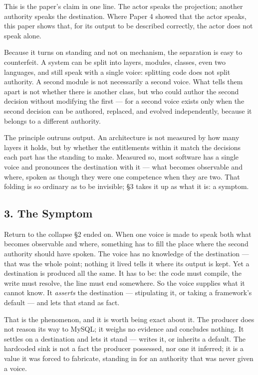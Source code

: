 \documentclass[
]{article}
\begin{document}
This is the paper's claim in one line. The actor speaks the projection;
another authority speaks the destination. Where Paper 4 showed that the
actor speaks, this paper shows that, for its output to be described
correctly, the actor does not speak alone.

Because it turns on standing and not on mechanism, the separation is
easy to counterfeit. A system can be split into layers, modules,
classes, even two languages, and still speak with a single voice:
splitting code does not split authority. A second module is not
necessarily a second voice. What tells them apart is not whether there
is another class, but who could author the second decision without
modifying the first --- for a second voice exists only when the second
decision can be authored, replaced, and evolved independently, because
it belongs to a different authority.

The principle outruns output. An architecture is not measured by how
many layers it holds, but by whether the entitlements within it match
the decisions each part has the standing to make. Measured so, most
software has a single voice and pronounces the destination with it ---
what becomes observable and where, spoken as though they were one
competence when they are two. That folding is so ordinary as to be
invisible; §3 takes it up as what it is: a symptom.

\subsection{3. The Symptom}\label{the-symptom}

Return to the collapse §2 ended on. When one voice is made to speak both
what becomes observable and where, something has to fill the place where
the second authority should have spoken. The voice has no knowledge of
the destination --- that was the whole point; nothing it lived tells it
where its output is kept. Yet a destination is produced all the same. It
has to be: the code must compile, the write must resolve, the line must
end somewhere. So the voice supplies what it cannot know. It
\emph{asserts} the destination --- stipulating it, or taking a
framework's default --- and lets that stand as fact.

That is the phenomenon, and it is worth being exact about it. The
producer does not reason its way to MySQL; it weighs no evidence and
concludes nothing. It settles on a destination and lets it stand ---
writes it, or inherits a default. The hardcoded sink is not a fact the
producer possessed, nor one it inferred; it is a value it was forced to
fabricate, standing in for an authority that was never given a voice.
\end{document}
